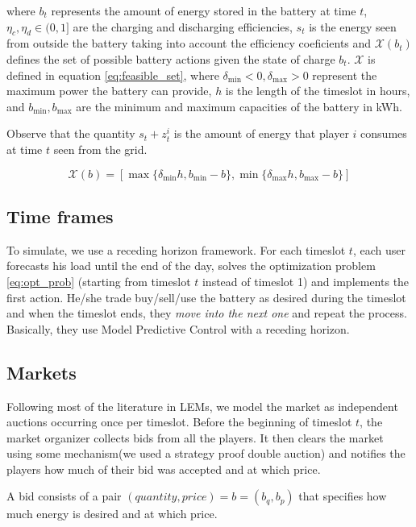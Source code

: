 \documentclass{article}
\begin{document}
where $b_t$ represents the amount of energy stored in the battery at time $t$, $\eta_c, \eta_d \in (0, 1]$ are the charging and discharging efficiencies, $s_t$ is the energy seen from outside the battery taking into account the efficiency coeficients and $\mathcal{X}(b_t)$ defines the set of possible battery actions given the state of charge $b_t$. $\mathcal{X}$ is defined in equation \eqref{eq:feasible_set}, where $\delta_{\min} < 0, \delta_{\max} > 0$ represent the maximum power the battery can provide, $h$ is the length of the timeslot in hours, and $b_{\min}, b_{\max}$ are the minimum and maximum capacities of the battery in kWh.

Observe that the quantity $s_t + z^i_t$ is the amount of energy that player $i$ consumes at time $t$ seen from the grid.

\begin{equation}
  \label{eq:feasible_set}
  \mathcal{X}(b) = \left[\max\{\delta_{\min}h, b_{\min} - b \}, \min\{
  \delta_{\max}h, b_{\max} - b\} \right]
\end{equation}

\subsection{Time frames}

To simulate, we use a receding horizon framework. For each timeslot $t$, each user forecasts his load until the end of the day, solves the optimization problem \eqref{eq:opt_prob} (starting from timeslot $t$ instead of timeslot 1) and implements the first action. He/she trade buy/sell/use the battery as desired during the timeslot and when the timeslot ends, they \textit{move into the next one} and repeat the process. Basically, they use Model Predictive Control with a receding horizon.

\subsection{Markets}

Following most of the literature in LEMs, we model the market as independent auctions occurring once per timeslot. Before the beginning of timeslot $t$, the market organizer collects bids from all the players. It then clears the market using some mechanism(we used a strategy proof double auction) and notifies the players how much of their bid was accepted and at which price.

A bid consists of a pair $(quantity, price) = b = (b_q, b_p)$ that specifies how much energy is desired and at which price.
\end{document}
